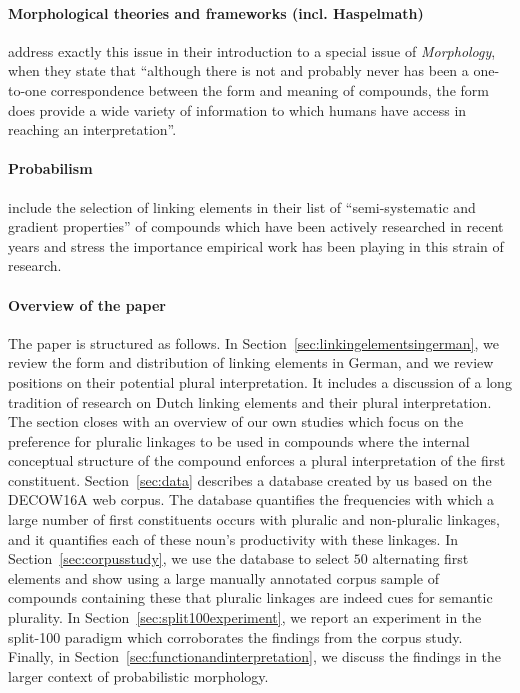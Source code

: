 \paragraph{Morphological theories and frameworks (incl. Haspelmath)}

\textcite[107]{ArndtlappeEa2016} address exactly this issue in their introduction to a special issue of \textit{Morphology}, when they state that ``although there is not and probably never has been a one-to-one correspondence between the form and meaning of compounds, the form does provide a wide variety of information to which humans have access in reaching an interpretation''.


\paragraph{Probabilism}


\textcite[105]{ArndtlappeEa2016} include the selection of linking elements in their list of ``semi-systematic and gradient properties'' of compounds which have been actively researched in recent years and stress the importance empirical work has been playing in this strain of research.


\paragraph{Overview of the paper}

The paper is structured as follows.
In Section~\ref{sec:linkingelementsingerman}, we review the form and distribution of linking elements in German, and we review positions on their potential plural interpretation.
It includes a discussion of a long tradition of research on Dutch linking elements and their plural interpretation.
The section closes with an overview of our own studies which focus on the preference for pluralic linkages to be used in compounds where the internal conceptual structure of the compound enforces a plural interpretation of the first constituent.
Section~\ref{sec:data} describes a database created by us based on the DECOW16A web corpus.
The database quantifies the frequencies with which a large number of first constituents occurs with pluralic and non-pluralic linkages, and it quantifies each of these noun's productivity with these linkages.
In Section~\ref{sec:corpusstudy}, we use the database to select $50$ alternating first elements and show using a large manually annotated corpus  sample of compounds containing these that pluralic linkages are indeed cues for semantic plurality.
In Section~\ref{sec:split100experiment}, we report an experiment in the split-100 paradigm which corroborates the findings from the corpus study.
Finally, in Section~\ref{sec:functionandinterpretation}, we discuss the findings in the larger context of probabilistic morphology.
